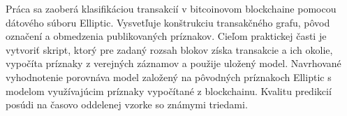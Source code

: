 Práca sa zaoberá klasifikáciou transakcií v bitcoinovom
blockchaine pomocou dátového súboru Elliptic. Vysvetľuje konštrukciu
transakčného grafu, pôvod označení a obmedzenia publikovaných
príznakov. Cieľom praktickej časti je vytvoriť skript, ktorý
pre zadaný rozsah blokov získa transakcie a ich okolie, vypočíta
príznaky z verejných záznamov a použije uložený model. Navrhované
vyhodnotenie porovnáva model založený na pôvodných príznakoch
Elliptic s modelom využívajúcim príznaky vypočítané z blockchainu.
Kvalitu predikcií posúdi na časovo oddelenej vzorke so známymi
triedami.
